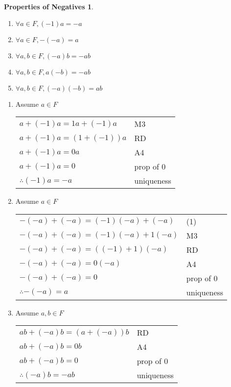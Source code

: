 \documentclass[letterpaper,12pt,fleqn]{article}
\begin{document}
\theoremstyle{mathitem}
\newtheorem*{inverse}{Properties of Negatives}
\begin{inverse}
\listbreak
\begin{enumerate}
\item{$\forall a\in F, (-1)a=-a$}
\item{$\forall a\in F, -(-a)=a$}
\item{$\forall a,b\in F, (-a)b=-ab$}
\item{$\forall a,b\in F, a(-b)=-ab$}
\item{$\forall a,b\in F, (-a)(-b)=ab$}
\end{enumerate}
\end{inverse}

\begin{theproof}
\listbreak
\begin{enumerate}
\item{Assume $a\in F$}

\begin{tabular}{ll}
$a+(-1)a=1a+(-1)a$ & M3 \\
$a+(-1)a=(1+(-1))a$ & RD \\
$a+(-1)a=0a$ & A4 \\
$a+(-1)a=0$ & prop of 0 \\
$\therefore (-1)a=-a$ & uniqueness \\
\end{tabular}

\item{Assume $a\in F$}

\begin{tabular}{ll}
$-(-a)+(-a)=(-1)(-a)+(-a)$ & (1) \\
$-(-a)+(-a)=(-1)(-a)+1(-a)$ & M3 \\
$-(-a)+(-a)=((-1)+1)(-a)$ & RD \\
$-(-a)+(-a)=0(-a)$ & A4 \\
$-(-a)+(-a)=0$ & prop of 0 \\
$\therefore -(-a)=a$ & uniqueness \\
\end{tabular}

\item{Assume $a,b\in F$}

\begin{tabular}{ll}
$ab+(-a)b=(a+(-a))b$ & RD \\
$ab+(-a)b=0b$ & A4 \\
$ab+(-a)b=0$ & prop of 0 \\
$\therefore (-a)b=-ab$ & uniqueness \\
\end{tabular}


\end{enumerate}
\end{theproof}
\end{document}
